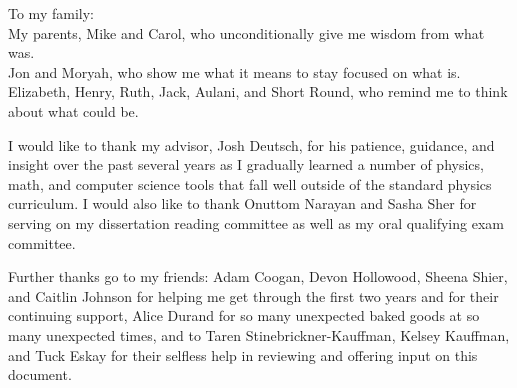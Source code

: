 \documentclass[11pt]{ucthesis}
\begin{document}
\begin{frontmatter}
\begin{abstract}
\begin{minipage}{\textwidth}
\end{minipage}
\end{abstract}

\begin{dedication}
\null\vfil
{\large
\begin{center}
To my family:\\\vspace{24pt}
My parents, Mike and Carol, who unconditionally give me wisdom from what was.\\\vspace{24pt}
Jon and Moryah, who show me what it means to stay focused on what is.\\\vspace{24pt}
Elizabeth, Henry, Ruth, Jack, Aulani, and Short Round, who remind me to think about what could be.
\end{center}}
\vfil\null
\end{dedication}


\begin{acknowledgements}

I would like to thank my advisor, Josh Deutsch, for his patience, guidance, and insight over the past several years as I gradually learned a number of physics, math, and computer science tools that fall well outside of the standard physics curriculum. I would also like to thank Onuttom Narayan and Sasha Sher for serving on my dissertation reading committee as well as my oral qualifying exam committee.

Further thanks go to my friends: Adam Coogan, Devon Hollowood, Sheena Shier, and Caitlin Johnson for helping me get through the first two years and for their continuing support, Alice Durand for so many unexpected baked goods at so many unexpected times, and to Taren Stinebrickner-Kauffman, Kelsey Kauffman, and Tuck Eskay for their selfless help in reviewing and offering input on this document. 


\end{acknowledgements}
\end{frontmatter}
\end{document}
